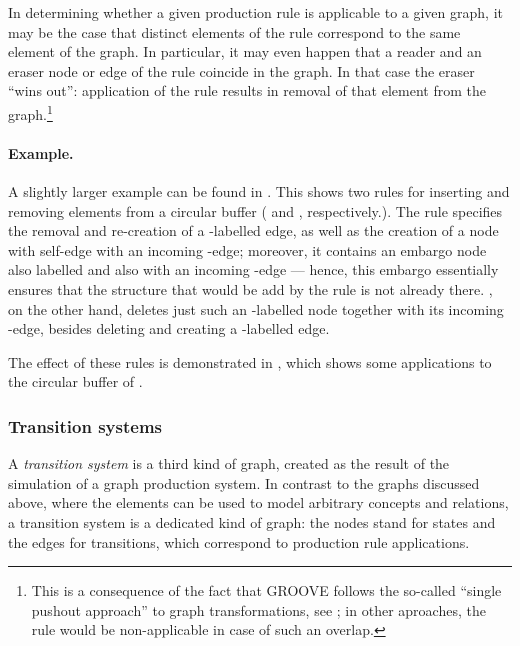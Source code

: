 In determining whether a given production rule is applicable to a given graph,
it may be the case that distinct elements of the rule correspond to the same
element of the graph. In particular, it may even happen that a reader and an
eraser node or edge of the rule coincide in the graph. In that case the eraser
``wins out'': application of the rule results in removal of that element from
the graph.\footnote{This is a consequence of the fact that GROOVE follows the
  so-called ``single pushout approach'' to graph transformations, see
  \cite{Loew93}; in other aproaches, the rule would be non-applicable in case
  of such an overlap.}

\paragraph{Example.}

A slightly larger example can be found in . This shows
two rules for inserting and removing elements from a circular buffer (\Put{}
and \Get, respectively.). The \Put{} rule specifies the removal and re-creation
of a \snip{\Last}-labelled edge, as well as the creation of a node with
self-edge \Object{} with an incoming \Val-edge; moreover, it contains an embargo
node also labelled \Object{} and also with an incoming \Val-edge --- hence,
this embargo essentially ensures that the structure that would be add by the
rule is not already there. \Get, on the other hand, deletes just such an
\Object-labelled node together with its incoming \Val-edge, besides deleting and
creating a \First-labelled edge.
%

The effect of these rules is demonstrated in , which
shows some applications to the circular buffer of .
%

\subsubsection{Transition systems}

A \emph{transition system} is a third kind of graph, created as the result of
the simulation of a graph production system. In contrast to the graphs
discussed above, where the elements can be used to model arbitrary concepts and
relations, a transition system is a dedicated kind of graph: the nodes stand
for states and the edges for transitions, which correspond to production rule
applications.

